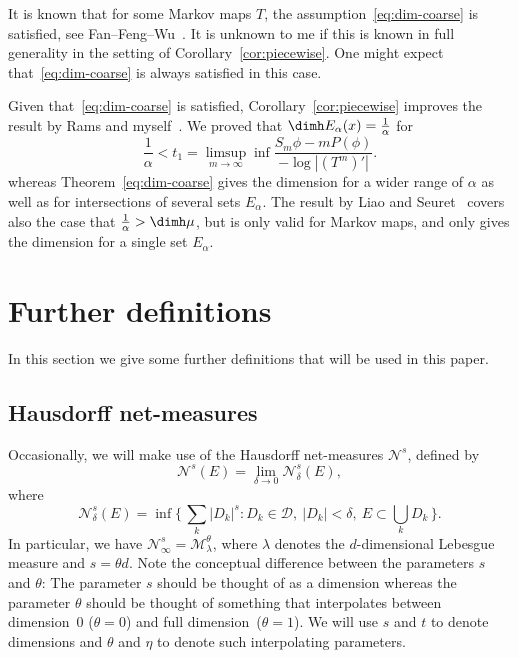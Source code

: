 \begin{rema}
It is known that for some Markov maps $T$, the assumption~\eqref{eq:dim-coarse} is satisfied, see Fan--Feng--Wu~\cite{fanfengwu}. It is unknown to me if this is known in full generality in the setting of Corollary~\ref{cor:piecewise}. One might expect that~\eqref{eq:dim-coarse} is always satisfied in this case.

Given that~\eqref{eq:dim-coarse} is satisfied, Corollary~\ref{cor:piecewise} improves the result by Rams and myself~\cite[Theorem~2]{perssonrams}. We proved that $\dimh E_\alpha (x) =
\frac{1}{\alpha}$ for
\[
\frac{1}{\alpha} < t_1 = \limsup_{m\to \infty} \inf \frac{S_m \phi - m P(\phi)}{- \log |(T^m)'|}.
\]
whereas Theorem~\ref{eq:dim-coarse} gives the dimension for a wider range of $\alpha$ as well as for intersections of several sets $E_\alpha$. The result by Liao and Seuret~\cite{liaoseuret} covers also the case that $\frac{1}{\alpha} > \dimh \mu$, but is only valid for Markov maps, and only gives the dimension for a single set $E_\alpha$.
\end{rema}



\section{Further definitions} \label{sec:furtherdefinitions}

In this section we give some further definitions that will be used in this paper.

\subsection{Hausdorff net-measures}

Occasionally, we will make use of the Hausdorff net-measures $\mathscr{N}^s$, defined by
\[
\mathscr{N}^s (E) = \lim_{\delta \to 0} \mathscr{N}_\delta^s (E),
\]
where
\[
\mathscr{N}_\delta^s (E) = \inf \biggl\{\, \sum_k |D_k|^s : D_k
\in \mathscr{D}, \ |D_k| < \delta,\ E \subset \bigcup_k D_k
\,\biggr\}.
\]
In particular, we have $\mathscr{N}_\infty^s =
\mathscr{M}_\lambda^{\theta}$, where $\lambda$ denotes the $d$-dimensional Lebesgue measure and $s = \theta d$. Note the conceptual difference between the parameters $s$ and $\theta$: The parameter $s$ should be thought of as a dimension whereas the parameter $\theta$ should be thought of something that interpolates between dimension~0 ($\theta = 0$) and full dimension~($\theta = 1$). We will use $s$ and $t$ to denote dimensions and $\theta$ and $\eta$ to denote such interpolating parameters.

